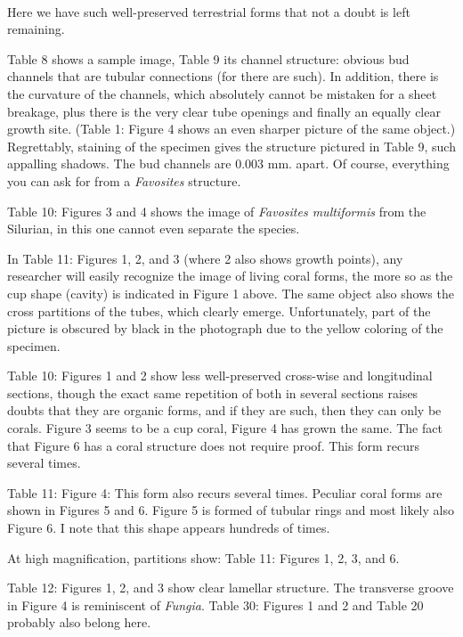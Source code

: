 \documentclass[a4paper, 12pt, oneside]{article}
\begin{document}
\paragraph*{}
Here we have such well-preserved terrestrial forms that not a doubt is left remaining.

Table 8 shows a sample image, Table 9 its channel structure: obvious bud channels that are tubular connections (for there are such). In addition, there is the curvature of the channels, which absolutely cannot be mistaken for a sheet breakage, plus there is the very clear tube openings and finally an equally clear growth site. (Table 1: Figure 4 shows an even sharper picture of the same object.) Regrettably, staining of the specimen gives the structure pictured in Table 9, such appalling shadows. The bud channels are 0.003 mm. apart. Of course, everything you can ask for from a \emph{Favosites} structure.

Table 10: Figures 3 and 4 shows the image of \emph{Favosites multiformis} from the Silurian, in this one cannot even separate the species.

In Table 11: Figures 1, 2, and 3 (where 2 also shows growth points), any researcher will easily recognize the image of living coral forms, the more so as the cup shape (cavity) is indicated in Figure 1 above. The same object also shows the cross partitions of the tubes, which clearly emerge. Unfortunately, part of the picture is obscured by black in the photograph due to the yellow coloring of the specimen.

Table 10: Figures 1 and 2 show less well-preserved cross-wise and longitudinal sections, though the exact same repetition of both in several sections raises doubts that they are organic forms, and if they are such, then they can only be corals. Figure 3 seems to be a cup coral, Figure 4 has grown the same. The fact that Figure 6 has a coral structure does not require proof. This form recurs several times.

Table 11: Figure 4: This form also recurs several times. Peculiar coral forms are shown in Figures 5 and 6. Figure 5 is formed of tubular rings and most likely also Figure 6. I note that this shape appears hundreds of times.

At high magnification, partitions show: Table 11: Figures 1, 2, 3, and 6.

Table 12: Figures 1, 2, and 3 show clear lamellar structure. The transverse groove in Figure 4 is reminiscent of \emph{Fungia}. Table 30: Figures 1 and 2 and Table 20 probably also belong here.
\end{document}
